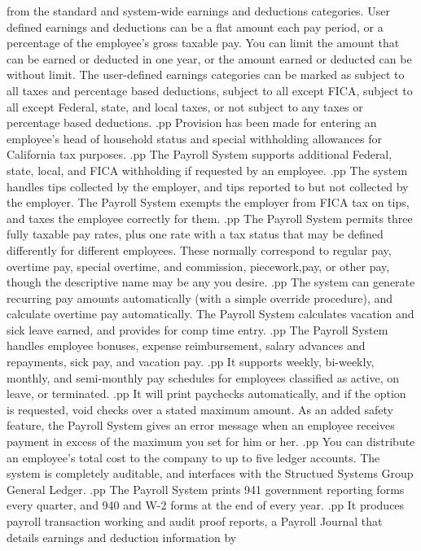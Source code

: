 from the standard and system-wide earnings and deductions categories.  User
defined earnings and deductions can be a flat amount each pay period,
or a percentage of the employee's gross taxable pay.  You can limit
the amount that can be earned or deducted in one year, or the amount
earned or deducted can be without limit.  The user-defined earnings
categories can be marked as subject to all taxes and percentage based
deductions, subject to all except FICA, subject to all except Federal,
state, and local taxes, or not subject to any taxes or percentage based
deductions.
.pp
Provision has been made for entering an employee's head of household
status and special withholding allowances for California tax purposes.
.pp
The Payroll System supports additional Federal, state, local, and FICA
withholding if requested by an employee.
.pp
The system handles tips collected by the employer, and tips
reported to but not collected by the employer.	The Payroll System
exempts the employer from FICA tax on tips, and taxes the employee
correctly for them.
.pp
The Payroll System permits three fully taxable pay rates, plus one
rate with a tax status that may be defined differently for different employees.
These normally
correspond to regular pay, overtime pay, special overtime, and
commission, piecework,pay, or other pay, though the descriptive name may be any
you desire.
.pp
The system can generate recurring pay amounts automatically (with a
simple override procedure), and calculate overtime pay automatically.
The Payroll System calculates vacation and sick leave
earned, and provides for comp time entry.
.pp
The Payroll System handles employee bonuses,
expense reimbursement, salary advances and repayments, sick pay, and
vacation pay.
.pp
It supports weekly, bi-weekly, monthly, and semi-monthly pay schedules for
employees classified as active, on leave, or terminated.
.pp
It will print paychecks automatically, and if the option is requested,
void checks over a stated maximum amount.  As an added safety feature,
the Payroll System gives an error message when an employee
receives payment in
excess of the maximum you set for him or her.
.pp
You can distribute an employee's total cost to the company to up
to five ledger accounts.  The system is completely
auditable, and interfaces
with the Structued Systems Group General Ledger.
.pp
The Payroll System prints 941 government reporting
forms every quarter, and 940 and W-2 forms
at the end of every year.
.pp
It produces payroll transaction working and audit proof reports, a
Payroll Journal that details earnings and deduction information by
